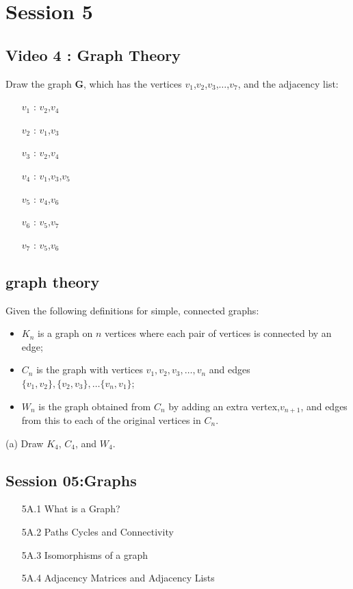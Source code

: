 \documentclass[]{report}
\begin{document}
\chapter{Session 5}
\section{Video 4 : Graph Theory}


Draw the graph \textbf{G}, which has the vertices $v_1$,$v_2$,$v_3$,$\ldots$,$v_7$, and the adjacency list:

\begin{itemize}
\item[$v_1$]: $v_2$,$v_4$
\item[$v_2$]: $v_1$,$v_3$
\item[$v_3$]: $v_2$,$v_4$
\item[$v_4$]: $v_1$,$v_3$,$v_5$
\item[$v_5$]: $v_4$,$v_6$
\item[$v_6$]: $v_5$,$v_7$
\item[$v_7$]: $v_5$,$v_6$
\end{itemize}

\section{graph theory }
Given the following definitions for simple, connected graphs:
\begin{itemize}
\item $K_n$ is a graph on $n$ vertices where each pair of vertices is connected by an edge;
\item $C_n$ is the graph with vertices $v_1, v_2, v_3, \dots, v_n$ and edges $\{v_1,v_2\}, \{v_2,v_3\}, \dots\{v_n, v_1\}$;
\item $W_n$ is the graph obtained from $C_n$ by adding an extra vertex,$v_{n+1}$, and edges
from this to each of the original vertices in $C_n$.
\end{itemize}
(a) Draw $K_4$, $C_4$, and $W_4$. 
\newpage
\section*{Session 05:Graphs}
\begin{itemize}
\item[5A.1] What is a Graph?
\item[5A.2] Paths Cycles and Connectivity
\item[5A.3] Isomorphisms of a graph
\item[5A.4] Adjacency Matrices and Adjacency Lists
\end{itemize}
\end{document}
